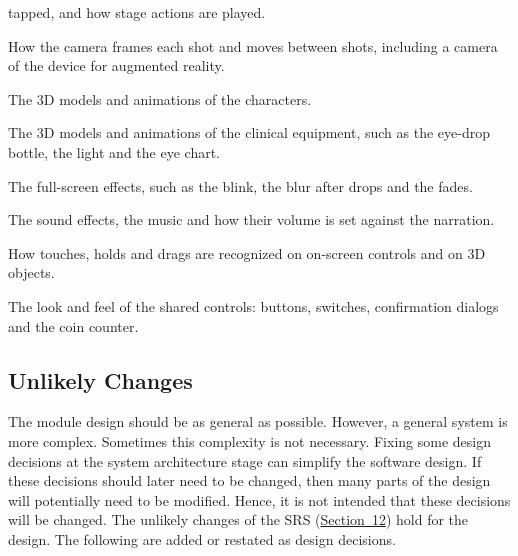 \documentclass[12pt, titlepage]{article}
\newcounter{acnum}
\newcommand{\actheacnum}{AC\theacnum}
\newcommand{\srsurl}{https://team-hindsight.github.io/ophthamology-game/SRS/SRS.pdf}
\newcommand{\srsitemref}[2]{\href{\srsurl\#nameddest=#1}{#2}}
\begin{document}
\begin{description}
  tapped, and how stage actions are played.
\item[\refstepcounter{acnum} \actheacnum \label{acCamera}:] How the camera
  frames each shot and moves between shots, including a camera of the device
  for augmented reality.
\item[\refstepcounter{acnum} \actheacnum \label{acRig}:] The 3D models and
  animations of the characters.
\item[\refstepcounter{acnum} \actheacnum \label{acProps}:] The 3D models and
  animations of the clinical equipment, such as the eye-drop bottle, the light
  and the eye chart.
\item[\refstepcounter{acnum} \actheacnum \label{acEffects}:] The full-screen
  effects, such as the blink, the blur after drops and the fades.
\item[\refstepcounter{acnum} \actheacnum \label{acSound}:] The sound effects,
  the music and how their volume is set against the narration.
\item[\refstepcounter{acnum} \actheacnum \label{acTouch}:] How touches, holds
  and drags are recognized on on-screen controls and on 3D objects.
\item[\refstepcounter{acnum} \actheacnum \label{acWidgets}:] The look and feel
  of the shared controls: buttons, switches, confirmation dialogs and the coin
  counter.
\end{description}

\subsection{Unlikely Changes} \label{SecUchange}

The module design should be as general as possible. However, a general system is
more complex. Sometimes this complexity is not necessary. Fixing some design
decisions at the system architecture stage can simplify the software design. If
these decisions should later need to be changed, then many parts of the design
will potentially need to be modified. Hence, it is not intended that these
decisions will be changed. The unlikely changes of the SRS
(\srsitemref{sec_UnlikelyChanges}{Section~12}) hold
for the design. The following are added or restated as design decisions.
\end{document}
